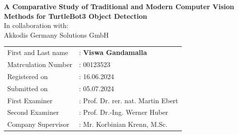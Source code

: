 \begin{titlepage}
\begin{center}
        \Large\textbf{A Comparative Study of Traditional and Modern Computer Vision Methods for TurtleBot3 Object Detection} \\[3em]
        \normalsize
        In collaboration with: \\
        Akkodis Germany Solutions GmbH 
        
    \end{center}

    \vfill

    \begin{center}
        \begin{tabular}{ll}
            First and Last name & : \textbf{Viswa Gandamalla}\\[1em]
            Matrculation Number & : 00123523\\[2em]
            Registered on & : 16.06.2024 \\[1em] %
            Submitted on & : 05.07.2024 \\[3em] %
            First Examiner & : Prof. Dr. rer. nat. Martin Ebert \\[1em]
            Second Examiner & : Prof. Dr.-Ing. Werner Huber \\[3em]
            Company Supervisor & : Mr. Korbinian Krenn, M.Sc. \\ %
        \end{tabular}
    \end{center}

\end{titlepage}

\restoregeometry
